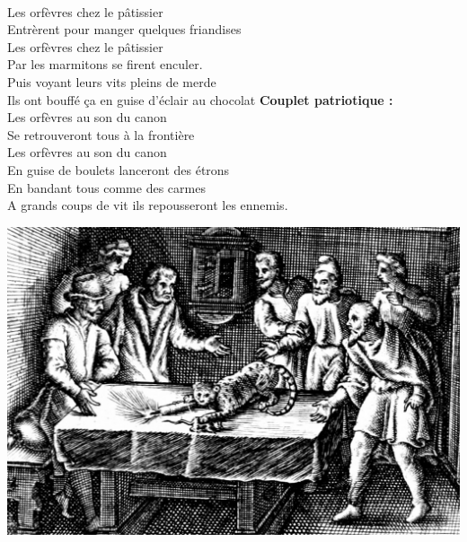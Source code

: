 \\Les orfèvres chez le pâtissier
\\Entrèrent pour manger quelques friandises
\\Les orfèvres chez le pâtissier
\\Par les marmitons se firent enculer.
\\Puis voyant leurs vits pleins de merde
\\Ils ont bouffé ça en guise d'éclair au chocolat
\breakpage
\textbf{Couplet patriotique :}
\\Les orfèvres au son du canon
\\Se retrouveront tous à la frontière
\\Les orfèvres au son du canon
\\En guise de boulets lanceront des étrons
\\En bandant tous comme des carmes
\\A grands coups de vit ils repousseront les ennemis.
\\
\bigskip
\begin{center}
\centering
    \includegraphics[width=1\textwidth]{images/brev6.png}
 \end{center}

\breakpage